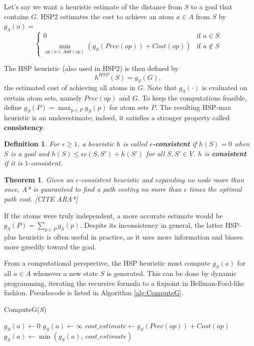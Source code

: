 \documentclass[letterpaper]{article}
\newtheorem{thm}{Theorem}
\newtheorem{defn}{Definition}
\begin{document}
Let's say we want a heuristic estimate of the distance from $S$ to a goal that contains $G$. HSP2 estimates the cost to achieve an atom $a\in A$ from $S$ by $g_S(a) = $
\[\begin{cases} 0  &\mbox{if } a \in S
\\ \min_{op\mid a\in Add(op)} \left(g_S(Prec(op)) + Cost(op)\right)  &\mbox{if } a \notin S \end{cases}\]

The HSP heuristic (also used in HSP2) is then defined by
\[h^{HSP}(S) = g_S(G),\]
the estimated cost of achieving all atoms in $G$. Note that $g_S(\cdot)$ is evaluated on certain atom sets, namely $Prec(op)$ and $G$.
To keep the computations feasible, define $g_S(P) = \max_{p\in P} g_S(p)$ for atom sets $P$.
The resulting HSP-max heuristic is an underestimate; indeed, it satisfies a stronger property called \textbf{consistency}.

\begin{defn} For $\epsilon\ge 1$, a heuristic $h$ is called \textbf{$\epsilon$-consistent} if $h(S) = 0$ when $S$ is a goal and $h(S) \le \epsilon c(S,S') + h(S')$ for all $S,S'\in V$. $h$ is \textbf{consistent} if it is $1$-consistent. \end{defn}
\begin{thm} Given an $\epsilon$-consistent heuristic and expanding no node more than once, A* is guaranteed to find a path costing no more than $\epsilon$ times the optimal path cost. [CITE ARA*] \end{thm}

If the atoms were truly independent, a more accurate estimate would be $g_S(P) = \sum_{p\in P} g_S(p)$.
Despite its inconsistency in general, the latter HSP-plus heuristic is often useful in practice, as it uses more information and biases more greedily toward the goal.

From a computational perspective, the HSP heuristic must compute $g_S(a)$ for all $a\in A$ whenever a new state $S$ is generated.
This can be done by dynamic programming, iterating the recursive formula to a fixpoint in Bellman-Ford-like fashion.
Pseudocode is listed in Algorithm \ref{alg:ComputeG}.

\begin{algorithm}
\caption{ComputeG($S$)}
\label{alg:ComputeG}
\begin{algorithmic}
\STATE $g_S(a) \leftarrow 0$
\ELSE
\STATE $g_S(a) \leftarrow \infty$
\ENDIF
\ENDFOR
\REPEAT
{}
\STATE $cost\_estimate \leftarrow g_S(Prec(op)) + Cost(op)$
\STATE $g_S(a) \leftarrow \min \left(g_S(a),~cost\_estimate\right)$
\ENDFOR
\ENDFOR
{}
\end{algorithmic}
\end{algorithm}
\end{document}
